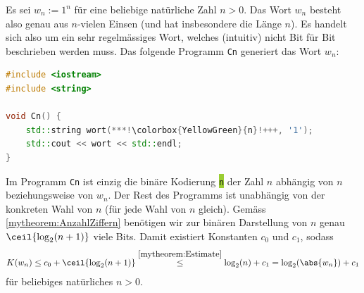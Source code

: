\begin{myexample}\label{myexample:wn}
Es sei $w_n := 1^n$ für eine beliebige natürliche Zahl $n > 0$. Das Wort $w_n$ besteht also genau aus $n$-vielen Einsen (und hat insbesondere die Länge $n$). Es handelt sich also um ein sehr regelmässiges Wort, welches (intuitiv) nicht Bit für Bit beschrieben werden muss. Das folgende Programm \texttt{Cn} generiert das Wort $w_n$:
\begin{lstlisting}[language=C++,escapechar=!] 
#include <iostream>
#include <string>

void Cn() {
    std::string wort(***!\colorbox{YellowGreen}{n}!+++, '1');
    std::cout << wort << std::endl;
}
\end{lstlisting}
Im Programm \texttt{Cn} ist einzig die binäre Kodierung \colorbox{YellowGreen}{\texttt{n}} der Zahl $n$ abhängig von $n$ beziehungsweise von $w_n$. Der Rest des Programms ist unabhängig von der konkreten Wahl von $n$ (für jede Wahl von $n$ gleich). Gemäss \cref{mytheorem:AnzahlZiffern} benötigen wir zur binären Darstellung von $n$ genau $\ceil{\log_2(n+1)}$ viele Bits. Damit existiert Konstanten $c_0$ und $c_1$, sodass
\begin{align*}
	K(w_n) \leq c_0 + \ceil{\log_2(n+1)} \stackrel{\cref{mytheorem:Estimate}}{\leq} \log_2(n) + c_1 = \log_2(\abs{w_n}) + c_1
\end{align*}
für beliebiges natürliches $n>0$.
\end{myexample}

